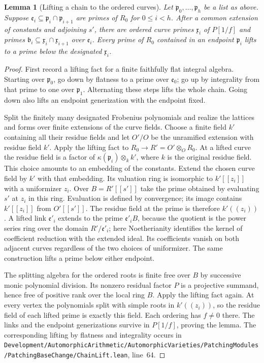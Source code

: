 \documentclass[a4paper,11pt]{article}
\newtheorem{lemma}[proposition]{Lemma}
\theoremstyle{definition}
\theoremstyle{remark}
\newcommand{\srcloc}[2]{{\small\nolinkurl{#1.lean}}, line~#2}
\numberwithin{equation}{section}
\begin{document}
\begin{lemma}[Lifting a chain to the ordered curves]\leavevmode
\label{lem:chainorder417}
Let \(\mathfrak p_0,\ldots,\mathfrak p_h\) be a list as above.
Suppose \(\mathfrak e_i\subseteq
\mathfrak p_i\cap\mathfrak p_{i+1}\) are primes of \(R_0\)
for \(0\le i<h\). After a common extension of constants and
adjoining \(s'\), there are ordered curve primes
\(\mathfrak x_i\) of \(P[1/f]\) and primes
\(\mathfrak b_i\subseteq\mathfrak x_i\cap\mathfrak x_{i+1}\)
over \(\mathfrak e_i\). Every prime of \(R_0\) contained in an
endpoint \(\mathfrak p_i\) lifts to a prime below the designated
\(\mathfrak x_i\).
\end{lemma}
\begin{proof}
First record a lifting fact for a finite faithfully flat
integral algebra. Starting over \(\mathfrak p_0\), go down by
flatness to a prime over \(\mathfrak e_0\); go up by integrality
from that prime to one over \(\mathfrak p_1\). Alternating
these steps lifts the whole chain. Going down also lifts an
endpoint generization with the endpoint fixed.

Split the finitely many designated Frobenius polynomials and
realize the lattices and forms over finite extensions of the
curve fields. Choose a finite field \(k'\) containing all
their residue fields and let \(O'/O\) be the unramified
extension with residue field \(k'\). Apply the lifting fact
to \(R_0\to R'=O'\otimes_O R_0\). At a lifted curve the
residue field is a factor of
\(\kappa(\mathfrak p_i)\otimes_k k'\), where \(k\) is the
original residue field. This choice amounts to an embedding
of the constants. Extend the chosen curve field by \(k'\)
with that embedding. Its valuation ring is isomorphic to
\(k'[[z_i]]\) with a uniformizer \(z_i\). Over
\(B=R'[[s']]\) take the prime obtained by evaluating \(s'\)
at \(z_i\) in this ring. Evaluation is defined by convergence;
its image contains \(k'[[z_i]]\) from \(O'[[s']]\). The
residue field at the prime is therefore \(k'((z_i))\).
A lifted link \(\mathfrak e'_i\) extends to the prime
\(\mathfrak e'_i B\), because the quotient is the power
series ring over the domain \(R'/\mathfrak e'_i\); here
Noetherianity identifies the kernel of coefficient reduction
with the extended ideal. Its coefficients vanish on both
adjacent curves regardless of the two choices of uniformizer.
The same construction lifts a prime below either endpoint.

The splitting algebra for the ordered roots is finite free
over \(B\) by successive monic polynomial division. Its
nonzero residual factor \(P\) is a projective summand,
hence free of positive rank over the local ring \(B\).
Apply the lifting fact again. At every vertex the polynomials
split with simple roots in \(k'((z_i))\), so the residue
field of each lifted prime is exactly this field. Each
ordering has \(f\ne0\) there. The links and the endpoint
generizations survive in \(P[1/f]\), proving the lemma.
The corresponding lifting by flatness and integrality occurs
in \srcloc{Development/AutomorphicArithmetic/AutomorphicVarieties/PatchingModules/PatchingBaseChange/ChainLift}{64}.
\end{proof}
\end{document}

